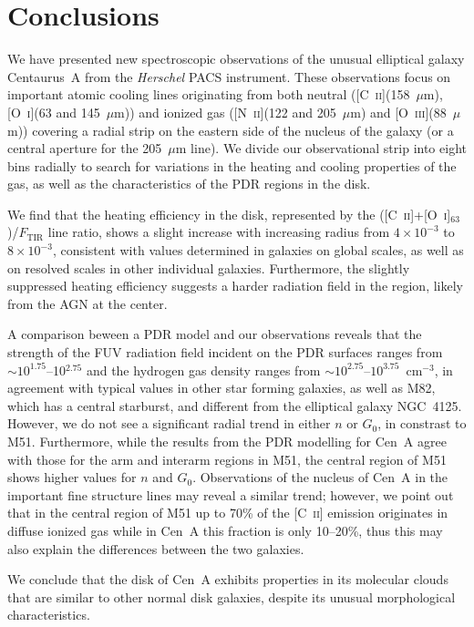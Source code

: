 \documentclass[preprint2]{aastex}
\begin{document}
\section{Conclusions}\label{conclusions}
We have presented new spectroscopic observations of the unusual elliptical galaxy Centaurus~A from the \emph{Herschel} PACS instrument.  These observations focus on important atomic cooling lines originating from both neutral ([C~\textsc{ii}](158~$\mu$m), [O~\textsc{i}](63 and 145~$\mu$m)) and ionized gas ([N~\textsc{ii}](122 and 205~$\mu$m) and [O~\textsc{iii}](88~$\mu$m)) covering a radial strip on the eastern side of the nucleus of the galaxy (or a central aperture for the 205~$\mu$m line).  We divide our observational strip into eight bins radially to search for variations in the heating and cooling properties of the gas, as well as the characteristics of the PDR regions in the disk.

We find that the heating efficiency in the disk, represented by the ([C~\textsc{ii}]+[O~\textsc{i}]$_{63}$)/$F_{\mathrm{TIR}}$ line ratio, shows a slight increase with increasing radius from $4 \times 10^{-3}$ to $8 \times 10^{-3}$, consistent with values determined in galaxies on global scales, as well as on resolved scales in other individual galaxies.  Furthermore, the slightly suppressed heating efficiency suggests a harder radiation field in the region, likely from the AGN at the center.

A comparison beween a PDR model and our observations reveals that the strength of the FUV radiation field incident on the PDR surfaces ranges from $\sim 10^{1.75}$--10$^{2.75}$ and the hydrogen gas density ranges from $\sim 10^{2.75}$--$10^{3.75}$~cm$^{-3}$, in agreement with typical values in other star forming galaxies, as well as M82, which has a central starburst, and different from the elliptical galaxy NGC~4125.  However, we do not see a significant radial trend in either $n$ or $G_{0}$, in constrast to M51.  Furthermore, while the results from the PDR modelling for Cen~A agree with those for the arm and interarm regions in M51, the central region of M51 shows higher values for $n$ and $G_{0}$.  Observations of the nucleus of Cen~A in the important fine structure lines may reveal a similar trend; however, we point out that in the central region of M51 up to 70\% of the [C~\textsc{ii}] emission originates in diffuse ionized gas while in Cen~A this fraction is only 10--20\%, thus this may also explain the differences between the two galaxies.

We conclude that the disk of Cen~A exhibits properties in its molecular clouds that are similar to other normal disk galaxies, despite its unusual morphological characteristics.
\end{document}
